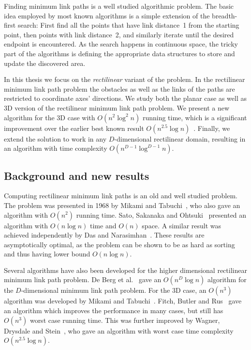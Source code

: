 \documentclass[english,gradu]{tktltiki2018}
\begin{document}
Finding minimum link paths is a well studied algorithmic problem\cite{dasnar,de1991,de1992,fitch,handbook,restricted,wagner}.
The basic idea employed by most known algorithms is a simple extension of the breadth-first search:
First find all the points that have link distance~1 from the starting point, then points with link distance~2, and similarly iterate until the desired endpoint is encountered.
As the search happens in continuous space, the tricky part of the algorithms is defining the appropriate data structures to store and update the discovered area.

In this thesis we focus on the \emph{rectilinear} variant of the problem.
In the rectilinear minimum link path problem the obstacles as well as the links of the paths are restricted to coordinate axes' directions.
We study both the planar case as well as 3D version of the rectilinear minimum link path problem.
We present a new algorithm for the 3D case with $O(n^2\log^2n)$ running time, which is a significant improvement over the earlier best known result $O(n^{2.5}\log n)$~\cite{restricted}.
Finally, we extend the solution to work in any $D$-dimensional rectilinear domain, resulting in an algorithm with time complexity $O(n^{D-1}\log^{D-1}n)$.

\subsection{Background and new results}

Computing rectilinear minimum link paths is an old and well studied problem.
The problem was presented in 1968 by Mikami and Tabuchi~\cite{mikami}, who also gave an algorithm with $O(n^2)$ running time.
Sato, Sakanaka and Ohtsuki~\cite{sato} presented an algorithm with $O(n\log n)$ time and $O(n)$ space.
A similar result was achieved independently by Das and Narasimhan~\cite{dasnar}.
These results are asymptotically optimal, as the problem can be shown to be as hard as sorting~\cite{dasnar} and thus having lower bound $O(n\log n)$.

Several algorithms have also been developed for the higher dimensional rectilinear minimum link path problem.
De Berg et al.~\cite{de1992} gave an $O(n^D\log n)$ algorithm for the $D$-dimensional minimum link path problem.
For the 3D case, an $O(n^3)$ algorithm was developed by Mikami and Tabuchi~\cite{mikami}.
Fitch, Butler and Rus~\cite{fitch} gave an algorithm which improves the performance in many cases, but still has $O(n^3)$ worst case running time.
This was further improved by Wagner, Drysdale and Stein~\cite{wagner}, who gave an algorithm with worst case time complexity $O(n^{2.5}\log n)$.
\end{document}
